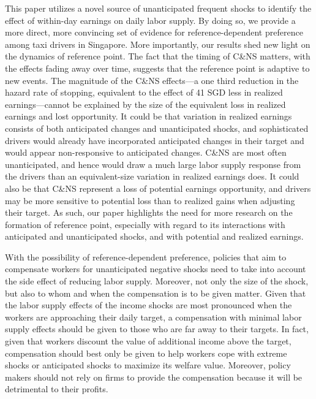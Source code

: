\documentclass[reviewmode,AEJ]{AEA}
\begin{document}
This paper utilizes a novel source of unanticipated frequent shocks to identify the effect of within-day 
earnings on daily labor supply. By doing so, we provide a more direct, more convincing set of evidence for 
reference-dependent preference among taxi drivers in Singapore. More importantly, our results shed new light 
on the dynamics of reference point. The fact that the timing of C\&NS matters, with the effects fading away
over time, suggests that the reference point is adaptive to new events. The magnitude of the C\&NS effects---a
one third reduction in the hazard rate of stopping, equivalent to the effect of 41 SGD less in realized 
earnings---cannot be explained by the size of the equivalent loss in realized earnings and lost opportunity.
It could be that variation 
in realized earnings consists of both anticipated changes and unanticipated shocks, and sophisticated drivers 
would already have incorporated anticipated changes in their target and would appear non-responsive to
anticipated changes. C\&NS are most often unanticipated, and hence would draw a much large labor supply 
response from the drivers than an equivalent-size variation in realized earnings does. It could also be
that C\&NS represent a loss of potential earnings opportunity, and drivers may be more sensitive to potential
loss than to realized gains when adjusting their target. As such, our paper highlights the need for more research
on the formation of reference point, especially with regard to its interactions with anticipated and
unanticipated shocks, and with potential and realized earnings.


With the possibility of reference-dependent preference, policies that aim to compensate workers for unanticipated negative shocks need to take into account the side effect of reducing labor supply. Moreover, not only the size of the shock, but also to whom and when the compensation is to be given matter. Given that the labor supply effects of the income shocks are most pronounced when the workers are approaching their daily target, a compensation with minimal labor supply effects should be given to those who are far away to their targets. In fact, given that workers discount the value of additional income above the target, compensation should best only be given to help workers cope with extreme shocks or anticipated shocks to maximize its welfare value. Moreover, policy makers should not rely on firms to provide the compensation because it will be detrimental to their profits.
\end{document}
